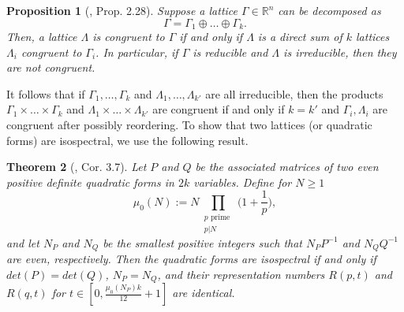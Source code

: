 \documentclass{amsart}
\newtheorem{theorem}{Theorem}[section]
\newtheorem{proposition}[theorem]{Proposition}
\theoremstyle{definition}
\newcommand*{\R}{\mathbb{R}}
\begin{document}
\begin{proposition}[\cite{nilsson2022isospectral}, Prop. 2.28] \label{prop:reducible_lattice_products}
    Suppose a lattice $\Gamma \in \R^n$ can be decomposed as
    \begin{equation*}
        \Gamma = \Gamma_1 \oplus \dots \oplus \Gamma_k.
    \end{equation*}
    Then, a lattice $\Lambda$ is congruent to $\Gamma$ if and only if $\Lambda$ is a direct sum of $k$ lattices $\Lambda_i$ congruent to $\Gamma_i$. In particular, if $\Gamma$ is reducible and $\Lambda$ is irreducible, then they are not congruent.
\end{proposition}
It follows that if $\Gamma_1,\dots,\Gamma_k$ and $\Lambda_1,\dots,\Lambda_{k'}$ are all irreducible, then the products $\Gamma_1 \times \dots \times \Gamma_k$ and $\Lambda_1 \times \dots \times \Lambda_{k'}$ are congruent if and only if $k = k'$ and $\Gamma_i,\Lambda_i$ are congruent after possibly reordering.  To show that two lattices (or quadratic forms) are isospectral, we use the following result.
\begin{theorem}[\cite{nilsson2022isospectral}, Cor. 3.7] \label{theorem:Isospectrality_certificate}
    Let $P$ and $Q$ be the associated matrices of two even positive definite quadratic forms in $2k$ variables. Define for $N \geq 1$
    \begin{equation*}
        \mu_0(N) := N\prod_{\substack{p \text{ prime } \\ p | N}}\biggl(1 + \frac{1}{p}\biggr),
    \end{equation*}
    and let $N_P$ and $N_Q$ be the smallest positive integers such that $N_PP^{-1}$ and $N_QQ^{-1}$ are even, respectively. Then the quadratic forms are isospectral if and only if $det(P) = det(Q)$, $N_P = N_Q$, and their representation numbers $R(p,t)$ and $R(q,t)$ for $t \in [0, \frac{\mu_0(N_P)k}{12} + 1]$ are identical. %
\end{theorem}
\end{document}
